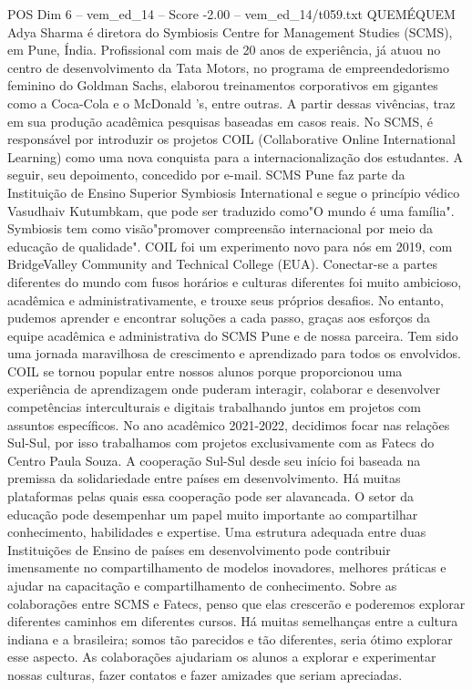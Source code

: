 \begin{textsample}{POS Dim 6 – vem\_ed\_14 – Score -2.00 – vem\_ed\_14/t059.txt}  \label{ex:f6_pos_090}
QUEMÉQUEM Adya Sharma é diretora do Symbiosis Centre for Management Studies (SCMS), em Pune, Índia.
Profissional com mais de 20 anos de experiência, já atuou no centro de desenvolvimento da Tata Motors, no programa de empreendedorismo feminino do Goldman Sachs, elaborou treinamentos corporativos em gigantes como a Coca-Cola e o McDonald 's, entre outras.
A partir dessas vivências, traz em sua produção acadêmica pesquisas baseadas em casos reais.
No SCMS, é responsável por introduzir os projetos COIL (Collaborative Online International Learning) como uma nova conquista para a internacionalização dos estudantes.
A seguir, seu depoimento, concedido por e-mail.
SCMS Pune faz parte da Instituição de Ensino Superior Symbiosis International e segue o princípio védico Vasudhaiv Kutumbkam, que pode ser traduzido como"O mundo é uma família".
Symbiosis tem como visão"promover compreensão internacional por meio da educação de qualidade".
COIL foi um experimento novo para nós em 2019, com BridgeValley Community and Technical College (EUA).
Conectar-se a partes diferentes do mundo com fusos horários e culturas diferentes foi muito ambicioso, acadêmica e administrativamente, e trouxe seus próprios desafios.
No entanto, pudemos aprender e encontrar soluções a cada passo, graças aos esforços da equipe acadêmica e administrativa do SCMS Pune e de nossa parceira.
Tem sido uma jornada maravilhosa de crescimento e aprendizado para todos os envolvidos.
COIL se tornou popular entre nossos alunos porque proporcionou uma experiência de aprendizagem onde puderam interagir, colaborar e desenvolver competências interculturais e digitais trabalhando juntos em projetos com assuntos específicos.
No ano acadêmico 2021-2022, decidimos focar nas relações Sul-Sul, por isso trabalhamos com projetos exclusivamente com as Fatecs do Centro Paula Souza.
A cooperação Sul-Sul desde seu início foi baseada na premissa da solidariedade entre países em desenvolvimento.
Há muitas plataformas pelas quais essa cooperação pode ser alavancada.
O setor da educação pode desempenhar um papel muito importante ao compartilhar conhecimento, habilidades e expertise.
Uma estrutura adequada entre duas Instituições de Ensino de países em desenvolvimento pode contribuir imensamente no compartilhamento de modelos inovadores, melhores práticas e ajudar na capacitação e compartilhamento de conhecimento.
Sobre as colaborações entre SCMS e Fatecs, penso que elas crescerão e poderemos explorar diferentes caminhos em diferentes cursos.
Há muitas semelhanças entre a cultura indiana e a brasileira; somos tão parecidos e tão diferentes, seria ótimo explorar esse aspecto.
As colaborações ajudariam os alunos a explorar e experimentar nossas culturas, fazer contatos e fazer amizades que seriam apreciadas.

\end{textsample}
